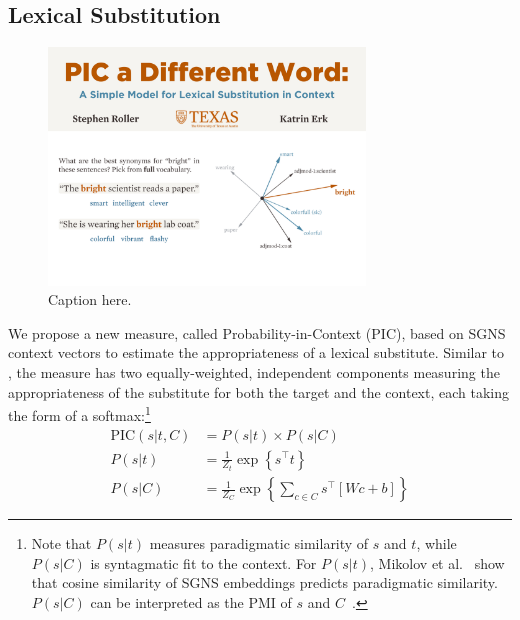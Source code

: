 \documentclass[letterpaper]{article}
\begin{document}
\subsection{Lexical Substitution \cite{roller:2016:naacl}}
\label{sec:pic}

\begin{figure}
  \centering
  \includegraphics[width=0.75\textwidth]{figures/substitution}
  \caption{Caption here.}
  \label{fig:substitution}
\end{figure}



We propose a new measure, called Probability-in-Context (PIC), based
on SGNS context vectors to estimate the appropriateness
of a lexical substitute. Similar to \balAddCos, the measure has two equally-weighted,
independent components measuring the appropriateness of the substitute
for both the target and the context, each taking the form of a softmax:\footnote{Note that $P(s|t)$ measures paradigmatic similarity
  of $s$ and $t$, while $P(s|C)$ is syntagmatic fit to the
  context.
  For $P(s|t)$,
  Mikolov et al.~ show that cosine
  similarity of SGNS embeddings predicts
  paradigmatic similarity. $P(s|C)$ can be interpreted as the PMI of
  $s$ and $C$~\cite{levy:2014:nips}.}
\begin{equation}
  \begin{aligned}
  \mbox{PIC}(s | t, C) &= P(s | t) \times P(s | C)\\
  P(s | t) &= \frac{1}{Z_t}\exp\left\{s^\top t\right\}\\ %
  P(s | C) &= \frac{1}{Z_C}\exp\left\{\sum_{c\in C}s^\top\left[Wc + b\right]\right\}
  \end{aligned}
  \label{eqn:pic}
\end{equation}
\end{document}
